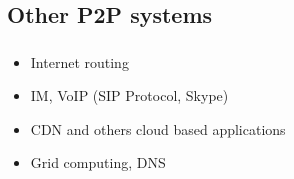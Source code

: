   \subsection{Other P2P systems}
    \begin{frame}
      \frametitle{\secname}
      \framesubtitle{\subsecname}
      \begin{itemize}
        \item Internet routing
        \item IM, VoIP (SIP Protocol, Skype)
        \item CDN and others cloud based applications
        \item Grid computing, DNS
      \end{itemize}
    \end{frame}
